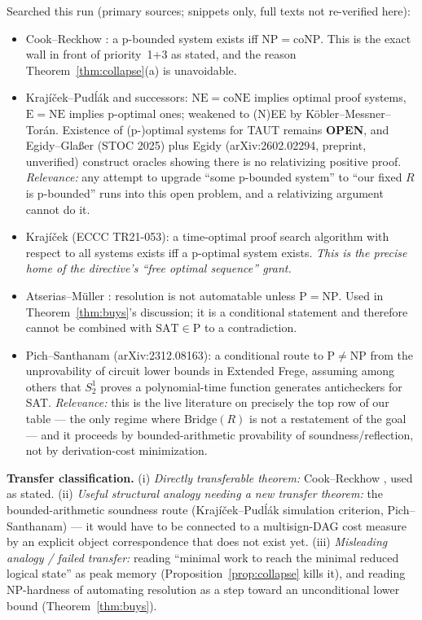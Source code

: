 \documentclass[11pt]{article}
\theoremstyle{definition}
\begin{document}
Searched this run (primary sources; snippets only, full texts not re-verified
here):
\begin{itemize}
\item Cook--Reckhow \cite{cookreckhow79}: a p-bounded system exists iff
$\mathrm{NP}=\mathrm{coNP}$. This is the exact wall in front of priority~1+3 as
stated, and the reason Theorem~\ref{thm:collapse}(a) is unavoidable.
\item Kraj\'i\v{c}ek--Pud\'l\'ak and successors: $\mathrm{NE}=\mathrm{coNE}$
implies optimal proof systems, $\mathrm E=\mathrm{NE}$ implies p-optimal ones;
weakened to (N)EE by K\"obler--Messner--Tor\'an. Existence of (p-)optimal
systems for TAUT remains \textbf{OPEN}, and Egidy--Gla\ss er (STOC 2025) plus
Egidy (arXiv:2602.02294, preprint, unverified) construct oracles showing there
is no relativizing positive proof. \emph{Relevance:} any attempt to upgrade
``some p-bounded system'' to ``our fixed $R$ is p-bounded'' runs into this
open problem, and a relativizing argument cannot do it.
\item Kraj\'i\v{c}ek (ECCC TR21-053): a time-optimal proof search algorithm
with respect to all systems exists iff a p-optimal system exists. \emph{This is
the precise home of the directive's ``free optimal sequence'' grant.}
\item Atserias--M\"uller \cite{atseriasmuller20}: resolution is not
automatable unless $\mathrm P=\mathrm{NP}$. Used in
Theorem~\ref{thm:buys}'s discussion; it is a conditional statement and
therefore cannot be combined with $\mathrm{SAT}\in\mathrm P$ to a
contradiction.
\item Pich--Santhanam (arXiv:2312.08163): a conditional route to
$\mathrm P\neq\mathrm{NP}$ from the unprovability of circuit lower bounds in
Extended Frege, assuming among others that $S^1_2$ proves a polynomial-time
function generates anticheckers for SAT. \emph{Relevance:} this is the live
literature on precisely the top row of our table --- the only regime where
$\mathrm{Bridge}(R)$ is not a restatement of the goal --- and it proceeds by
bounded-arithmetic provability of soundness/reflection, not by derivation-cost
minimization.
\end{itemize}

\textbf{Transfer classification.} (i) \emph{Directly transferable theorem:}
Cook--Reckhow \cite{cookreckhow79}, used as stated.
(ii) \emph{Useful structural analogy needing a new transfer theorem:} the
bounded-arithmetic soundness route (Kraj\'i\v{c}ek--Pud\'l\'ak simulation
criterion, Pich--Santhanam) --- it would have to be connected to a
multisign-DAG cost measure by an explicit object correspondence that does not
exist yet. (iii) \emph{Misleading analogy / failed transfer:} reading
``minimal work to reach the minimal reduced logical state'' as peak memory
(Proposition~\ref{prop:collapse} kills it), and reading NP-hardness of
automating resolution as a step toward an unconditional lower bound
(Theorem~\ref{thm:buys}).
\end{document}
